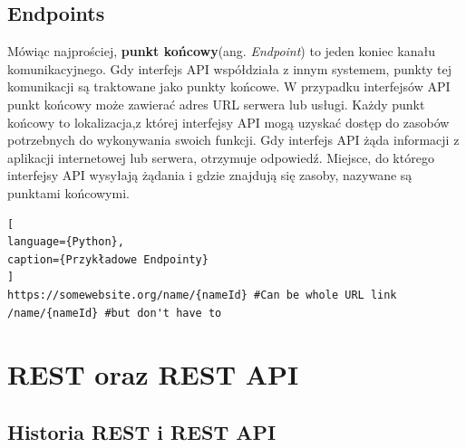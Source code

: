 \documentclass[oneside,polski,logo,indent]{amuthesis}
\begin{document}
\begin{center}
\subsection{Endpoints}
\end{center}
Mówiąc najprościej, \textbf{punkt końcowy}(ang. \emph{Endpoint}) to jeden koniec kanału komunikacyjnego. Gdy interfejs API współdziała z innym systemem, punkty tej komunikacji są traktowane jako punkty końcowe. W przypadku interfejsów API punkt końcowy może zawierać adres URL serwera lub usługi. Każdy punkt końcowy to lokalizacja,\break z której interfejsy API mogą uzyskać dostęp do zasobów potrzebnych do wykonywania swoich funkcji. Gdy interfejs API żąda informacji z aplikacji internetowej lub serwera, otrzymuje odpowiedź. Miejsce, do którego interfejsy API wysyłają żądania i gdzie znajdują się zasoby, nazywane są punktami końcowymi.

\begin{lstlisting}[
language={Python},
caption={Przykładowe Endpointy}
]
https://somewebsite.org/name/{nameId} #Can be whole URL link
/name/{nameId} #but don't have to
\end{lstlisting}

\section{REST oraz REST API}

\begin{center}
\subsection{Historia REST i REST API}
\end{center}
\end{document}

